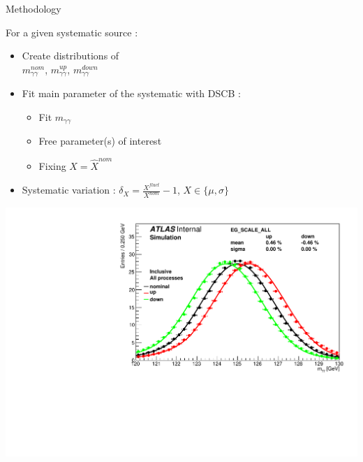 \begin{frame}{Methodology}
  \begin{minipage}{0.49\linewidth}
    For a given systematic source :
    \begin{itemize}
    \item Create distributions of \\ $m_{\gamma\gamma}^{nom}$, $m_{\gamma\gamma}^{up}$, $m_{\gamma \gamma}^{down}$
    \item Fit main parameter of the systematic with DSCB :
      \begin{itemize}
      \item Fit  $m_{\gamma\gamma}$
      \item Free parameter(s) of interest
      \item Fixing $X=\hat{X}^{nom}$
      \end{itemize}
      \item Systematic variation : $\delta_X=\frac{X^{fluct}}{X^{nom}}-1$, $X\in \{\mu , \sigma\}$
      \end{itemize}
    \end{minipage}
    \hfill
    \begin{minipage}{0.49\linewidth}
      \includegraphics[width=\linewidth]{plots/Backup/h013_EG_SCALE_ALL_0.pdf}
    \end{minipage}
    \vfill
    

\end{frame}
